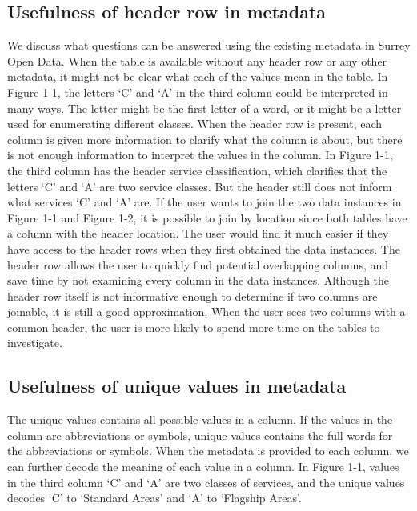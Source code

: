 \subsection{Usefulness of header row in metadata}
We discuss what questions can be answered using the existing metadata in Surrey Open Data. When the table is available without any header row or any other metadata, it might not be clear what each of the values mean in the table. In Figure 1-1, the letters ‘C’ and ‘A’ in the third column could be interpreted in many ways. The letter might be the first letter of a word, or it might be a letter used for enumerating different classes. When the header row is present, each column is given more information to clarify what the column is about, but there is not enough information to interpret the values in the column. In Figure 1-1, the third column has the header service classification, which clarifies that the letters ‘C’ and ‘A’ are two service classes. But the header still does not inform what services ‘C’ and ‘A’ are.
If the user wants to join the two data instances in Figure 1-1 and Figure 1-2, it is possible to join by location since both tables have a column with the header location. The user would find it much easier if they have access to the header rows when they first obtained the data instances. The header row allows the user to quickly find potential overlapping columns, and save time by not examining every column in the data instances. Although the header row itself is not informative enough to determine if two columns are joinable, it is still a good approximation. When the user sees two columns with a common header, the user is more likely to spend more time on the tables to investigate.

\subsection{Usefulness of unique values in metadata}

The unique values contains all possible values in a column. If the values in the column are abbreviations or symbols, unique values contains the full words for the abbreviations or symbols.
When the metadata is provided to each column, we can further decode the meaning of each value in a column. In Figure 1-1, values in the third column ‘C’ and ‘A’ are two classes of services, and the unique values decodes ‘C’ to ‘Standard Areas’ and ‘A’ to ‘Flagship Areas’.


